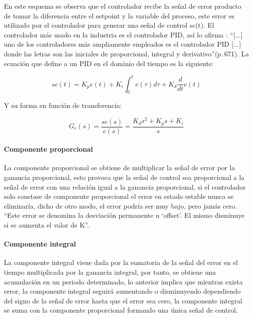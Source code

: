 			En este esquema se observa que el controlador recibe la señal de error producto de tomar la diferencia entre el setpoint y la variable del proceso, este error es utilizado por el controlador para generar una señal de control sc(t). El controlador más usado en la industria es el controlador PID, así lo afirma \textcite{kuo1996sistemas}: \enquote{[...] uno de los controladores más ampliamente empleados es el controlador PID [...] donde las letras son las iniciales de proporcional, integral y derivativo}(p.$\,$671). La ecuación que define a un PID en el dominio del tiempo es la siguiente:
			
			\begin{equation}\label{eq:pidtiempo}
				sc(t) = K_{p}e(t)+  K_{i}\int_{0}^{t} e(\tau) d\tau + K_{d} \frac{d}{dt}e(t)
			\end{equation}
			
			Y su forma en función de transferencia:
			
			\begin{equation}\label{eq:pidcompleja}
				G_{c}(s) = \frac{sc(s)}{e(s)} = \frac{K_{d}s^{2} + K_{p}s +  K_{i}}{s}
			\end{equation}
			
			\paragraph{Componente proporcional}

				La componente proporcional se obtiene de multiplicar la señal de error por la ganancia proporcional, esto provoca que la señal de control sea proporcional a la señal de error con una relación igual a la ganancia proporcional, si el controlador solo constase de componente proporcional el error en estado estable nunca se eliminaría, dicho de otro modo, el error podría ser muy bajo, pero jamás cero. \enquote{Este error se denomina la desviación permanente u \enquote{offset}. El mismo disminuye si se aumenta el valor de K}\Parencite[p.$\,$54]{nelson1999fundamentos}.

			\paragraph{Componente integral}

				La componente integral viene dada por la sumatoria de la señal del error en el tiempo multiplicada por la ganancia integral, por tanto, se obtiene una acumulación en un periodo determinado, lo anterior implica que mientras exista error, la componente integral seguirá aumentando o disminuyendo dependiendo del signo de la señal de error hasta que el error sea cero, la componente integral se suma con la componente proporcional formando una única señal de control.

